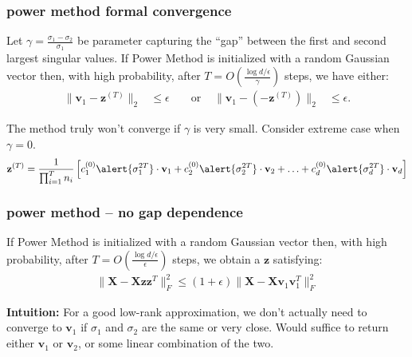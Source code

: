 \documentclass[compress]{beamer}
\newcommand{\bv}[1]{\mathbf{#1}}
\begin{document}
\begin{frame}[t]
	\frametitle{power method formal convergence}	
	\begin{theorem}
		Let $\gamma = \frac{\sigma_1 - \sigma_2}{\sigma_1}$ be  parameter capturing the ``gap'' between the first and second largest singular values. If Power Method is initialized with a random Gaussian vector then, with high probability, after $T = O\left(\frac{\log d/\epsilon}{\gamma}\right)$ steps, we have either:
		\begin{align*}
			\|\bv{v}_1 - \bv{z}^{(T)}\|_2 &\leq \epsilon &&\text{ or } &\|\bv{v}_1 - (-\bv{z}^{(T)})\|_2 &\leq \epsilon.
		\end{align*}
	\end{theorem}
	The method truly won't converge if $\gamma$ is very small. Consider extreme case when $\gamma = 0$.
	\begin{align*}
		\bv{z}^{(T)} = \frac{1}{\prod_{i=1}^T n_i} \left[ c_1^{(0)}\alert{\sigma_1^{2T}}\cdot \bv{v}_1 + c_2^{(0)} \alert{\sigma_2^{2T}}\cdot \bv{v}_2 + \ldots + c_d^{(0)} \alert{\sigma_d^{2T}}\cdot \bv{v}_d \right]
	\end{align*}
\end{frame}

\begin{frame}[t]
	\frametitle{power method -- no gap dependence}	
	\begin{theorem}
		 If Power Method is initialized with a random Gaussian vector then, with high probability, after $T = O\left(\frac{\log d/\epsilon}{\epsilon}\right)$ steps, we obtain a $\bv{z}$ satisfying:
		\begin{align*}
		\|\bv{X} - \bv{X}\bv{z}\bv{z}^{T}\|_F^2 \leq (1+\epsilon)\|\bv{X} - \bv{X}\bv{v}_1\bv{v}_1^T\|_F^2 
		\end{align*}
	\end{theorem}	
\textbf{Intuition:} For a good low-rank approximation, we don't actually need to converge to $\bv{v}_1$ if $\sigma_1$ and $\sigma_2$ are the same or very close. Would suffice to return either $\bv{v}_1$ or $\bv{v}_2$, or some linear combination of the two.
\end{frame}
\end{document}
